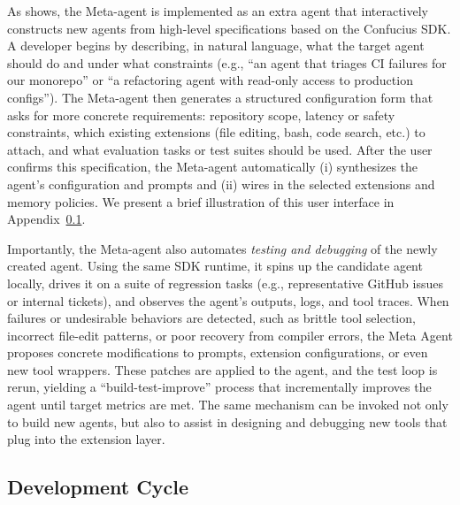 As  shows, the Meta-agent is implemented as an extra agent that interactively constructs new agents from high-level specifications based on the Confucius SDK. A developer begins by describing, in natural language, what the target agent should do and under what constraints (e.g., ``an agent that triages CI failures for our monorepo'' or ``a refactoring agent with read-only access to production configs''). The Meta-agent then generates a structured configuration form that asks for more concrete requirements: repository scope, latency or safety constraints, which existing extensions (file editing, bash, code search, etc.) to attach, and what evaluation tasks or test suites should be used. After the user confirms this specification, the Meta-agent automatically (i) synthesizes the agent’s configuration and prompts and (ii) wires in the selected extensions and memory policies. We present a brief illustration of this user interface in Appendix~\ref{sec.meta-agent-dev-cycle}.

Importantly, the Meta-agent also automates \emph{testing and debugging} of the newly created agent. Using the same SDK runtime, it spins up the candidate agent locally, drives it on a suite of regression tasks (e.g., representative GitHub issues or internal tickets), and observes the agent’s outputs, logs, and tool traces. When failures or undesirable behaviors are detected, such as brittle tool selection, incorrect file-edit patterns, or poor recovery from compiler errors, the Meta Agent proposes concrete modifications to prompts, extension configurations, or even new tool wrappers. These patches are applied to the agent, and the test loop is rerun, yielding a ``build-test-improve'' process that incrementally improves the agent until target metrics are met. The same mechanism can be invoked not only to build new agents, but also to assist in designing and debugging new tools that plug into the extension layer.


\subsection{Development Cycle}
\label{sec.meta-agent-dev-cycle}

